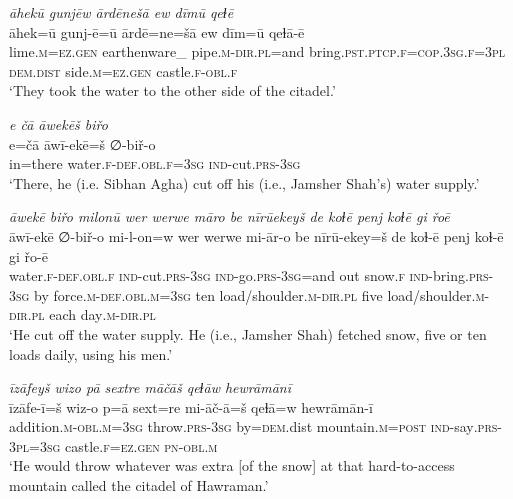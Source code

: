 \ea \label{DP.32}
\textit{āhekū gunjēw ārdēnešā ew dīmū qeɫē} \\ 
\gll āhek=ū gunj-ē=ū ārdē=ne=šā ew dīm=ū qeɫā-ē \\ 
 lime\textsc{.m}\textsc{=ez}\textsc{.gen} earthenware\_ pipe\textsc{.m}\textsc{-dir}\textsc{.pl}=and bring\textsc{.pst}\textsc{.ptcp}\textsc{\textsc{.f}}\textsc{=cop}\textsc{.3sg}\textsc{\textsc{.f}}\textsc{=3pl} \textsc{dem.dist} side\textsc{.m}\textsc{=ez}\textsc{.gen} castle\textsc{\textsc{.f}}\textsc{-obl}\textsc{\textsc{.f}} \\ 
\glt `They took the water to the other side of the citadel.'
\z 
 
\ea \label{DP.33}
\textit{e čā āwekēš biřo} \\ 
\gll e=čā āwī-ekē=š ∅-biř-o \\ 
 in=there water\textsc{\textsc{.f}}\textsc{-def}\textsc{.obl}\textsc{\textsc{.f}}\textsc{=3sg} \textsc{ind-}cut\textsc{.prs}\textsc{-3sg} \\ 
\glt `There, he (i.e. Sibhan Agha) cut off his (i.e., Jamsher Shah’s) water supply.'
\z 
 
\ea \label{DP.34}
\textit{āwekē biřo milonū wer werwe māro be nīrūekeyš de koɫē penj koɫē gi řoē} \\ 
\gll āwī-ekē ∅-biř-o mi-l-on=w wer werwe mi-ār-o be nīrū-ekey=š de koɫ-ē penj koɫ-ē gi řo-ē \\ 
 water\textsc{\textsc{.f}}\textsc{-def}\textsc{.obl}\textsc{\textsc{.f}} \textsc{ind-}cut\textsc{.prs}\textsc{-3sg} \textsc{ind-}go\textsc{.prs}\textsc{-3sg}=and out snow\textsc{\textsc{.f}} \textsc{ind-}bring\textsc{.prs}\textsc{-3sg} by force\textsc{.m}\textsc{-def}\textsc{.obl}\textsc{.m}\textsc{=3sg} ten load/shoulder\textsc{.m}\textsc{-dir}\textsc{.pl} five load/shoulder\textsc{.m}\textsc{-dir}\textsc{.pl} each day\textsc{.m}\textsc{-dir}\textsc{.pl} \\ 
\glt `He cut off the water supply. He (i.e., Jamsher Shah) fetched snow, five or ten loads daily, using his men.'
\z 
 
\ea \label{DP.35}
\textit{īzāfeyš wizo pā sextre māčāš qeɫāw hewrāmānī} \\ 
\gll īzāfe-ī=š wiz-o p=ā sext=re mi-āč-ā=š qeɫā=w hewrāmān-ī \\ 
 addition\textsc{.m}\textsc{-obl}\textsc{.m}\textsc{=3sg} throw\textsc{.prs}\textsc{-3sg} by\textsc{=dem}.dist mountain\textsc{.m}\textsc{=\textsc{post}} \textsc{ind-}say\textsc{.prs}\textsc{-3pl}\textsc{=3sg} castle\textsc{\textsc{.f}}\textsc{=ez}\textsc{.gen} \textsc{pn}\textsc{-obl}\textsc{.m} \\ 
\glt `He would throw whatever was extra [of the snow] at that hard-to-access mountain called the citadel of Hawraman.'
\z 
 
